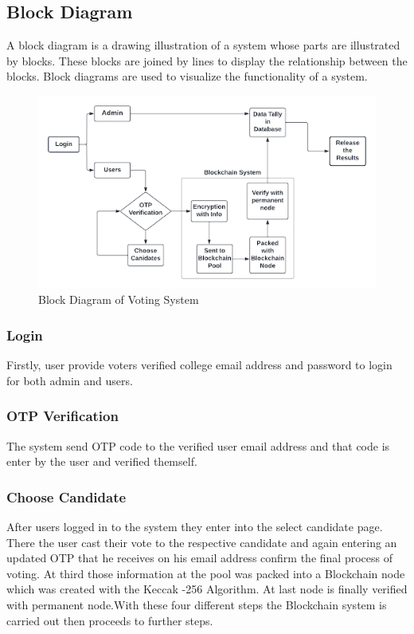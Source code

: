 \subsection{Block Diagram}
A block diagram is a drawing illustration of a system whose parts are illustrated by blocks. These blocks are joined by lines to display the relationship between the blocks. Block diagrams are used to visualize the functionality of a system.

\begin{figure}[tbh] %
\begin{center}
	\includegraphics[width = 5.5in]{images/bloakchainDiagram.png}
	\caption{Block Diagram of Voting System} %
	\label{figSample1} %
\end{center}
\end{figure}

\subsubsection{Login}
Firstly, user provide voters verified college email address and password to login for both admin and users.

\subsubsection{OTP Verification}
The system send OTP code to the verified user email address and that code is enter by the user and verified themself.

\subsubsection{Choose Candidate}
After users logged in to the system they enter into the select candidate page. There the user cast their vote to the respective candidate and again entering an updated OTP that he receives on his email address confirm the final process of voting. At third those information at the pool was packed into a Blockchain node which was created with the Keccak -256 Algorithm. At last node is finally verified with permanent node.With these four different steps the Blockchain system is carried out then proceeds to further steps.

